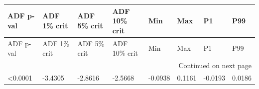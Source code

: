 \begingroup
\footnotesize
\setlength{\tabcolsep}{3pt}
\begin{longtable}{@{}llllllll@{}}
\toprule
ADF p-val & ADF 1\% crit & ADF 5\% crit & ADF 10\% crit & Min & Max & P1 & P99 \\
\midrule
\endfirsthead
\toprule
ADF p-val & ADF 1\% crit & ADF 5\% crit & ADF 10\% crit & Min & Max & P1 & P99 \\
\midrule
\endhead
\midrule
\multicolumn{8}{r}{Continued on next page} \\
\midrule
\endfoot
\bottomrule
\endlastfoot
<0.0001 & -3.4305 & -2.8616 & -2.5668 & -0.0938 & 0.1161 & -0.0193 & 0.0186 \\
\end{longtable}
\endgroup
